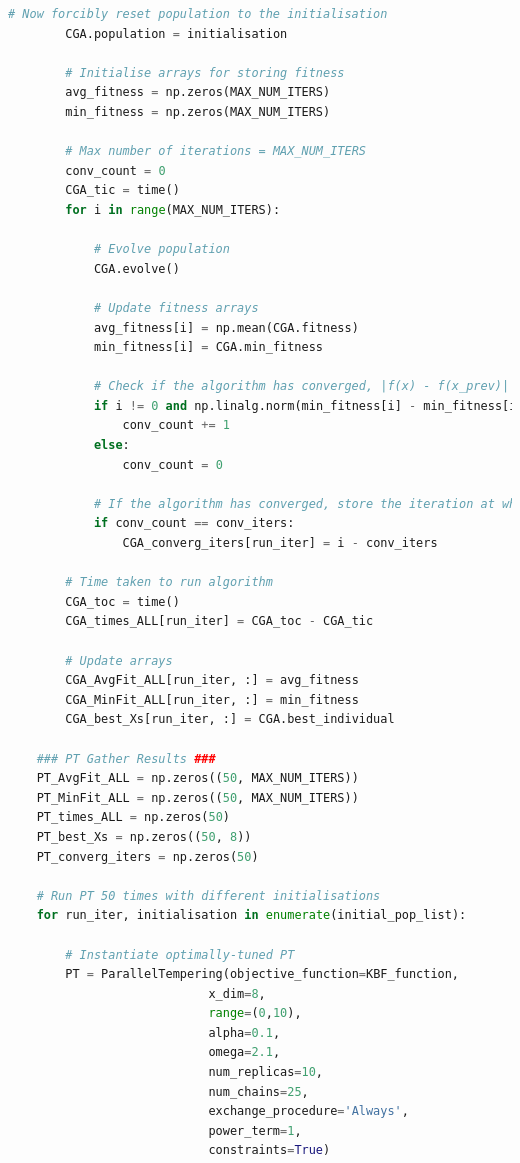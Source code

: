 \documentclass[10pt]{article}
\begin{document}
\begin{lstlisting}[language=Python, caption=FinalComparison.py, label=FinalComparisonpy]
        # Now forcibly reset population to the initialisation
        CGA.population = initialisation
    
        # Initialise arrays for storing fitness
        avg_fitness = np.zeros(MAX_NUM_ITERS)
        min_fitness = np.zeros(MAX_NUM_ITERS)
    
        # Max number of iterations = MAX_NUM_ITERS
        conv_count = 0
        CGA_tic = time()
        for i in range(MAX_NUM_ITERS):
            
            # Evolve population
            CGA.evolve()
    
            # Update fitness arrays
            avg_fitness[i] = np.mean(CGA.fitness)
            min_fitness[i] = CGA.min_fitness
    
            # Check if the algorithm has converged, |f(x) - f(x_prev)| < eps for 'conv_iters' iterations
            if i != 0 and np.linalg.norm(min_fitness[i] - min_fitness[i-1]) < eps:
                conv_count += 1
            else:
                conv_count = 0
    
            # If the algorithm has converged, store the iteration at which it converged
            if conv_count == conv_iters:
                CGA_converg_iters[run_iter] = i - conv_iters
    
        # Time taken to run algorithm
        CGA_toc = time()
        CGA_times_ALL[run_iter] = CGA_toc - CGA_tic
        
        # Update arrays
        CGA_AvgFit_ALL[run_iter, :] = avg_fitness
        CGA_MinFit_ALL[run_iter, :] = min_fitness
        CGA_best_Xs[run_iter, :] = CGA.best_individual
    
    ### PT Gather Results ###
    PT_AvgFit_ALL = np.zeros((50, MAX_NUM_ITERS))
    PT_MinFit_ALL = np.zeros((50, MAX_NUM_ITERS))
    PT_times_ALL = np.zeros(50)
    PT_best_Xs = np.zeros((50, 8))
    PT_converg_iters = np.zeros(50)
    
    # Run PT 50 times with different initialisations
    for run_iter, initialisation in enumerate(initial_pop_list):
    
        # Instantiate optimally-tuned PT
        PT = ParallelTempering(objective_function=KBF_function, 
                            x_dim=8, 
                            range=(0,10), 
                            alpha=0.1, 
                            omega=2.1, 
                            num_replicas=10, 
                            num_chains=25, 
                            exchange_procedure='Always', 
                            power_term=1, 
                            constraints=True)
        

\end{lstlisting}
\end{document}
